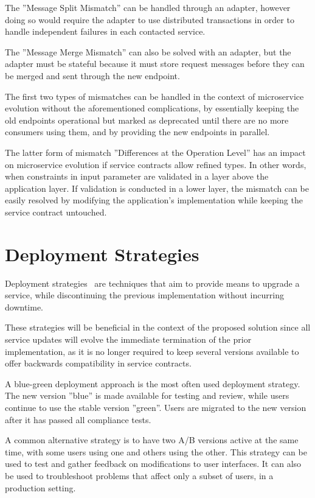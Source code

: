 The ''Message Split Mismatch'' can be handled through an adapter, however doing so
would require the adapter to use distributed transactions in order to handle independent failures in each contacted service.

The ''Message Merge Mismatch'' can also be solved with an adapter, but the adapter must be stateful because it must store request messages before they can be merged and sent through the new endpoint.

The first two types of mismatches can be handled in the context of microservice evolution without the aforementioned complications,
by essentially keeping the old endpoints operational but marked as deprecated until  there are no more consumers using them, and by providing the new endpoints in parallel.

The latter form of mismatch ''Differences at the Operation Level'' has an impact on microservice evolution if service contracts allow refined types.
In other words, when constraints in input parameter are validated in a layer above the application layer.
If validation is conducted in a lower layer, the mismatch can be easily resolved by modifying the application's implementation while keeping the service contract untouched.

\section{Deployment Strategies} %
\label{sec:deployment_strategies}

Deployment strategies~\cite{deploymentstrategies} are techniques that aim to provide means to upgrade a service,
while discontinuing the previous implementation without incurring downtime.

These strategies will be beneficial in the context of the proposed solution since all service updates will evolve the immediate termination of the prior implementation,
as it is no longer required to keep several versions available to offer backwards compatibility in service contracts.

A blue-green deployment approach is the most often used deployment strategy.
The new version ''blue'' is made available for testing and review, while users continue to use the stable version ''green''.
Users are migrated to the new version after it has passed all compliance tests.

A common alternative strategy is to have two A/B versions active at the same time, with some users using one and others using the other.
This strategy can be used to test and gather feedback on modifications to user interfaces.
It can also be used to troubleshoot problems that affect only a subset of users, in a production setting.

